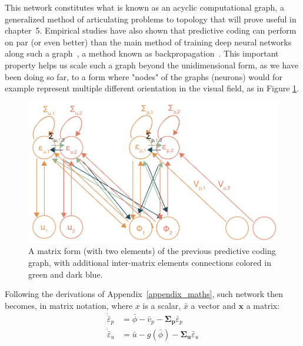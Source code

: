 This network constitutes what is known as an acyclic computational graph, a generalized method of articulating problems to topology that will prove useful in chapter~5. Empirical studies have also shown that predictive coding can perform on par (or even better) than the main method of training deep neural networks along such a graph~\cite{millidge2022predictive}, a method known as backpropagation~\cite{lecun1989backpropagation}. This important property helps us scale such a graph beyond the unidimensional form, as we have been doing so far, to a form where "nodes" of the graphs (neurons) would for example represent multiple different orientation in the visual field, as in Figure \ref{fig_chap2_pc_matrix_graphs}.

\begin{figure}[h!tbp]
\vspace{0.5cm}
\centering
\includegraphics[width=.85\textwidth]{fig/chap2_fig_pc_graph_matrix.pdf}
\caption[A matrix form predictive coding graph.]{A matrix form (with two elements) of the previous predictive coding graph, with additional inter-matrix elements connections colored in green and dark blue.}
\label{fig_chap2_pc_matrix_graphs}
\end{figure}

Following the derivations of Appendix~\ref{appendix_maths}, such network then becomes, in matrix notation, where $\mathit{x}$ is a scalar, $\bar{x}$ a vector and $\mathbf{x}$ a matrix:
\begin{equation}
    \begin{aligned}
       \dot{\bar{\varepsilon}}_p &= \bar{\phi} - \bar{v}_p - \mathbf{\Sigma_p}\bar{\varepsilon}_p \\
       \dot{\bar{\varepsilon}}_u &= \bar{u} - g(\bar{\phi}) - \mathbf{\Sigma_u}\bar{\varepsilon}_u
    \end{aligned}
\end{equation}

